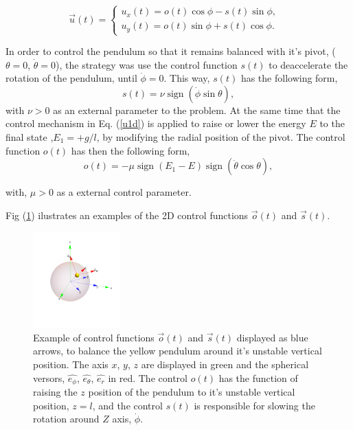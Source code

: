 \documentclass[prd,twocolumn,nofootinbib,showpacs]{revtex4-1}
\DeclareMathOperator{\sign}{sign}
\begin{document}
\begin{equation}
\Vec{u}(t)=\begin{cases}
    u_x(t)=o(t) \cos{\phi} -s(t) \sin{\phi}, &\\
    u_y(t)=o(t) \sin{\phi}+ s(t) \cos{\phi}. &
    \end{cases}
    \label{accel}
\end{equation}
\par In order to control the pendulum so that it remains balanced with it's pivot, ($\theta=0$,  $\dot{\theta}=0$), the strategy was use the control function  $s(t)$ to deaccelerate the rotation of the pendulum, until $\dot{\phi}=0$. This way, $s(t)$ has the following form, 
\begin{equation}
s(t)=\nu \sign{(\dot{\phi}\sin{\theta})}, 
\label{controlv2d}
\end{equation}
with $\nu >0$ as an external parameter to the problem.
\noindent At the same time that the control mechanism in Eq. (\ref{u1d}) is applied to raise or lower the energy $E$ to the final state ,$E_1=+g/l$, by modifying the radial position of the pivot. The control function $o(t)$ has then the following form,
\begin{equation}
 o(t)=-\mu  \sign\left({E_1-E}\right)\sign{(\dot{\theta} \cos{\theta})}, 
 \label{controlu2d}
\end{equation}

\noindent with, $\mu>0$ as a external control parameter. 
\par Fig (\ref{fig:control2d}) ilustrates an examples of the 2D control functions $\Vec{o}(t)$ and $\Vec{s}(t)$. 
\begin{figure}[H]
    \centering
    \includegraphics[width=0.3\textwidth]{Excontrolo4_1.png}
    \caption{Example of control functions $\Vec{o}(t)$ and $\Vec{s}(t)$ displayed as  blue arrows, to balance the yellow pendulum around it's unstable vertical position. The axis $x$, $y$, $z$ are displayed in green and the spherical versors, $\hat{e_{\phi}}$, $\hat{e_{\theta}}$, $\hat{e_r}$ in red. The control  $o(t)$  has the function of raising the $z$ position of the pendulum to it's unstable vertical position, $z=l$, and the control $s(t)$ is responsible for slowing the rotation around $Z$ axis, $\dot{\phi}$.} 
    \label{fig:control2d}
\end{figure}
\end{document}
